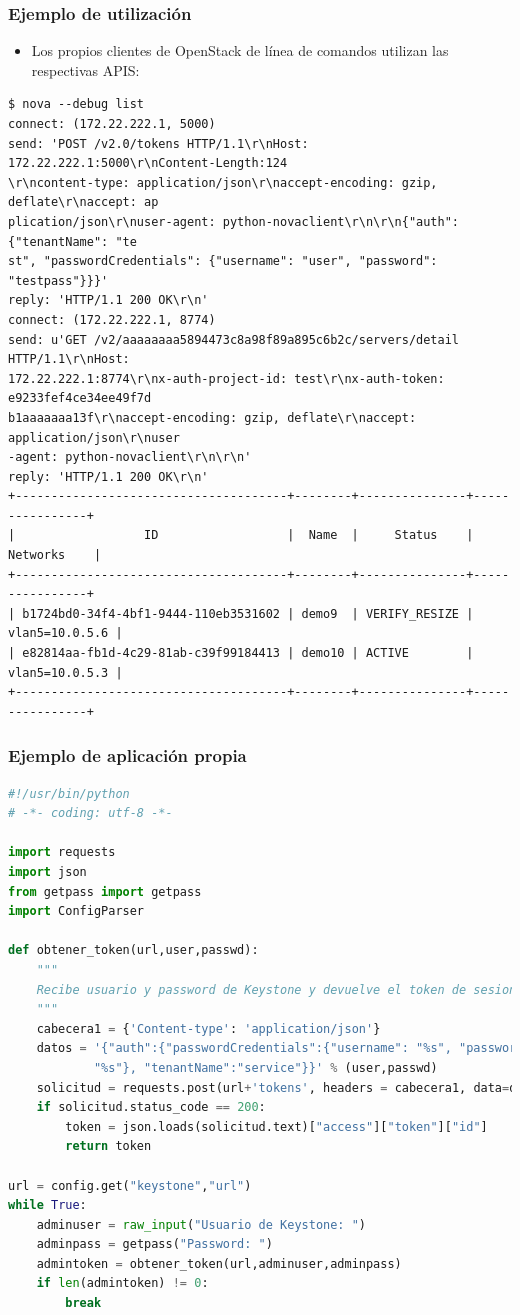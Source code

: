 \documentclass{beamer}
\begin{document}
\begin{frame}[fragile]
  \frametitle{Ejemplo de utilización}
  \begin{itemize}
  \item Los propios clientes de OpenStack de línea de comandos utilizan las
    respectivas APIS:
  \end{itemize}
    \begin{center}
  \begin{lstlisting}
$ nova --debug list
connect: (172.22.222.1, 5000)
send: 'POST /v2.0/tokens HTTP/1.1\r\nHost: 172.22.222.1:5000\r\nContent-Length:124
\r\ncontent-type: application/json\r\naccept-encoding: gzip, deflate\r\naccept: ap
plication/json\r\nuser-agent: python-novaclient\r\n\r\n{"auth": {"tenantName": "te
st", "passwordCredentials": {"username": "user", "password": "testpass"}}}'
reply: 'HTTP/1.1 200 OK\r\n'
connect: (172.22.222.1, 8774)
send: u'GET /v2/aaaaaaaa5894473c8a98f89a895c6b2c/servers/detail HTTP/1.1\r\nHost: 
172.22.222.1:8774\r\nx-auth-project-id: test\r\nx-auth-token: e9233fef4ce34ee49f7d
b1aaaaaaa13f\r\naccept-encoding: gzip, deflate\r\naccept: application/json\r\nuser
-agent: python-novaclient\r\n\r\n'
reply: 'HTTP/1.1 200 OK\r\n'
+--------------------------------------+--------+---------------+----------------+
|                  ID                  |  Name  |     Status    |    Networks    |
+--------------------------------------+--------+---------------+----------------+
| b1724bd0-34f4-4bf1-9444-110eb3531602 | demo9  | VERIFY_RESIZE | vlan5=10.0.5.6 |
| e82814aa-fb1d-4c29-81ab-c39f99184413 | demo10 | ACTIVE        | vlan5=10.0.5.3 |
+--------------------------------------+--------+---------------+----------------+
  \end{lstlisting}
\end{center}
\end{frame}

\begin{frame}[fragile]
  \frametitle{Ejemplo de aplicación propia}
  \begin{lstlisting}[language=python]
#!/usr/bin/python
# -*- coding: utf-8 -*-

import requests
import json
from getpass import getpass
import ConfigParser

def obtener_token(url,user,passwd):
    """
    Recibe usuario y password de Keystone y devuelve el token de sesion
    """
    cabecera1 = {'Content-type': 'application/json'}
    datos = '{"auth":{"passwordCredentials":{"username": "%s", "password": \
            "%s"}, "tenantName":"service"}}' % (user,passwd)
    solicitud = requests.post(url+'tokens', headers = cabecera1, data=datos)
    if solicitud.status_code == 200:
        token = json.loads(solicitud.text)["access"]["token"]["id"]
        return token

url = config.get("keystone","url")
while True:
    adminuser = raw_input("Usuario de Keystone: ")
    adminpass = getpass("Password: ")
    admintoken = obtener_token(url,adminuser,adminpass)
    if len(admintoken) != 0:
        break
  \end{lstlisting}
\end{frame}
\end{document}
